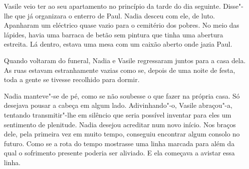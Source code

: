 Vasile veio ter ao seu apartamento no princípio da tarde
do dia seguinte. Disse"-lhe que já organizara o enterro de Paul. Nadia
desceu com ele, de luto. Apanharam um eléctrico quase vazio para o
cemitério dos pobres. No meio das lápides, havia uma barraca de betão
sem pintura que tinha uma abertura estreita. Lá dentro, estava uma mesa
com um caixão aberto onde jazia Paul.

Quando voltaram do funeral, Nadia e Vasile regressaram juntos para a
casa dela. As ruas estavam estranhamente vazias como se, depois de uma noite de festa, toda a gente se
tivesse recolhido para dormir.

Nadia manteve"-se de pé, como se não soubesse o que fazer na própria
casa. Só desejava pousar a cabeça em algum lado. Adivinhando"-o, Vasile
abraçou"-a, tentando transmitir"-lhe em silêncio que seria possível
inventar para eles um sentimento de plenitude. Nadia desejou acreditar
num novo início. Nos braços dele, pela primeira vez em muito tempo,
conseguiu encontrar algum consolo no futuro. Como se a rota do tempo
mostrasse uma linha marcada para além da qual o sofrimento presente
poderia ser aliviado. E ela começava a avistar essa linha.
